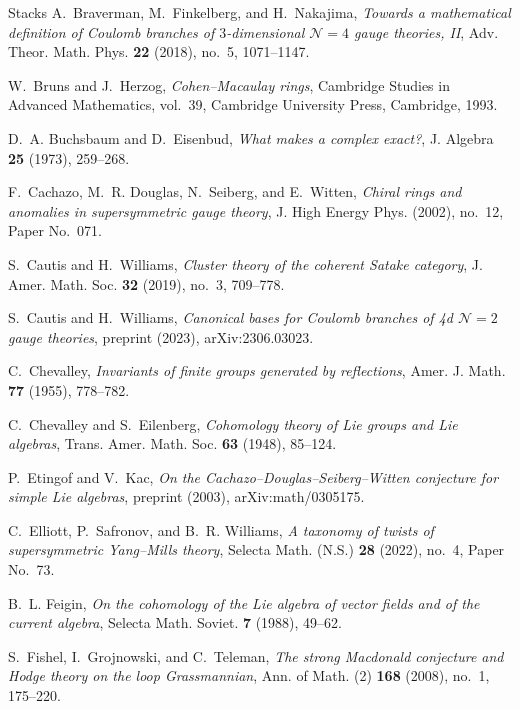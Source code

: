 \documentclass[11pt]{amsart}
\numberwithin{equation}{section}
\theoremstyle{definition}
\theoremstyle{remark}
\begin{document}
\begin{thebibliography}{Stacks}
A.~Braverman, M.~Finkelberg, and H.~Nakajima, \emph{Towards a mathematical definition of Coulomb branches of $3$-dimensional $\mathcal N=4$ gauge theories, {II}}, Adv. Theor. Math. Phys. \textbf{22} (2018), no.~5, 1071--1147.

W.~Bruns and J.~Herzog, \emph{Cohen--Macaulay rings}, Cambridge Studies in Advanced Mathematics, vol.~39, Cambridge University Press, Cambridge, 1993.

D.~A. Buchsbaum and D.~Eisenbud, \emph{What makes a complex exact?}, J. Algebra \textbf{25} (1973), 259--268.

F.~Cachazo, M.~R. Douglas, N.~Seiberg, and E.~Witten, \emph{Chiral rings and anomalies in supersymmetric gauge theory}, J. High Energy Phys. (2002), no.~12, Paper No.~071.

S.~Cautis and H.~Williams, \emph{Cluster theory of the coherent Satake category}, J. Amer. Math. Soc. \textbf{32} (2019), no.~3, 709--778.

S.~Cautis and H.~Williams, \emph{Canonical bases for Coulomb branches of 4d $\mathcal N=2$ gauge theories}, preprint (2023), arXiv:2306.03023.

C.~Chevalley, \emph{Invariants of finite groups generated by reflections}, Amer. J. Math. \textbf{77} (1955), 778--782.

C.~Chevalley and S.~Eilenberg, \emph{Cohomology theory of Lie groups and Lie algebras}, Trans. Amer. Math. Soc. \textbf{63} (1948), 85--124.

P.~Etingof and V.~Kac, \emph{On the Cachazo--Douglas--Seiberg--Witten conjecture for simple Lie algebras}, preprint (2003), arXiv:math/0305175.

C.~Elliott, P.~Safronov, and B.~R. Williams, \emph{A taxonomy of twists of supersymmetric Yang--Mills theory}, Selecta Math. (N.S.) \textbf{28} (2022), no.~4, Paper No.~73.

B.~L. Feigin, \emph{On the cohomology of the Lie algebra of vector fields and of the current algebra}, Selecta Math. Soviet. \textbf{7} (1988), 49--62.

S.~Fishel, I.~Grojnowski, and C.~Teleman, \emph{The strong Macdonald conjecture and Hodge theory on the loop Grassmannian}, Ann. of Math. (2) \textbf{168} (2008), no.~1, 175--220.


\end{thebibliography}
\end{document}
